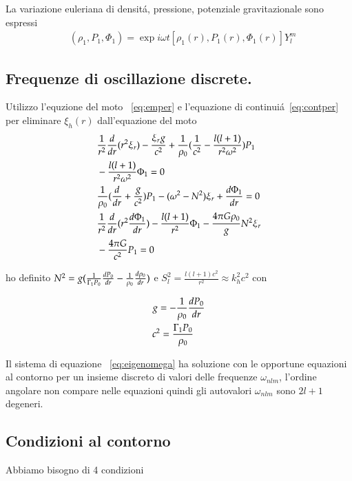 \documentclass[oneside,12pt,fleqn]{memoir}
\begin{document}
La variazione euleriana di densit\'a, pressione, potenziale gravitazionale sono espressi
\begin{align*}
&(\rho_1,P_1,\Phi_1)=\exp{i\omega t}[\rho_1(r),P_1(r),\Phi_1(r)]Y_l^m
\end{align*}

\subsection{Frequenze di oscillazione discrete.}

Utilizzo l'equzione del moto ~\ref{eq:emper} e l'equazione di continui\'a~\ref{eq:contper} per eliminare $\xi_h(r)$ dall'equazione del moto
\begin{align}
&\frac{1}{r^2}\TDof{r}(r^2\xi_r)-\frac{\xi_rg}{c^2}+\frac{1}{\rho_0}(\frac{1}{c^2}-\frac{l(l+1)}{r^2\omega^2})P_1\nonumber\\
&-\frac{l(l+1)}{r^2\omega^2}\Phi_1=0\nonumber\\
&\frac{1}{\rho_0}(\TDof{r}+\frac{g}{c^2})P_1-(\omega^2-N^2)\xi_r+\TDy{r}{\Phi_1}=0\label{eq:eigenomega}\\
&\frac{1}{r^2}\TDof{r}(r^2\TDy{r}{\Phi_1})-\frac{l(l+1)}{r^2}\Phi_1-\frac{4\pi G\rho_0}{g}N^2\xi_r\nonumber\\
&-\frac{4\pi G}{c^2}P_1=0\nonumber
\end{align}

ho definito $N^2=g(\frac{1}{\Gamma_1P_0}\TDy{r}{P_0}-\frac{1}{\rho_0}\TDy{r}{\rho_0})$ e $S_l^2=\frac{l(l+1)c^2}{r^2}\approx k_h^2c^2$ con

\begin{align*}
&g=-\frac{1}{\rho_0}\TDy{r}{P_0}\\
&c^2=\frac{\Gamma_1P_0}{\rho_0}
\end{align*}


Il sistema di equazione ~\ref{eq:eigenomega} ha soluzione con le opportune equazioni al contorno per un insieme discreto di valori delle frequenze $\omega_{nlm}$, l'ordine angolare non compare nelle equazioni quindi gli autovalori $\omega_{nlm}$ sono $2l+1$ degeneri.

\subsection{Condizioni al contorno}

Abbiamo bisogno di 4 condizioni
\end{document}

